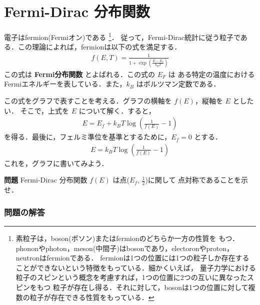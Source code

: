     \section{Fermi-Dirac 分布関数}
    電子はfermion(Fermiオン)である
        \footnote{
            素粒子は，boson(ボソン)またはfermionのどちらか一方の性質を
            もつ．phononやphoton，meson(中間子)はbosonであり，electoronやproton，neutronはfermionである．
            fermionは1つの位置には1つの粒子しか存在することができないという特徴をもっている．細かくいえば，
            量子力学における粒子のスピンという概念を考慮すれば，1つの位置に2つの互いに異なったスピンをもつ
            粒子が存在し得る．それに対して，bosonは1つの位置に対して複数の粒子が存在できる性質をもっている．
        }．
    従って，Fermi-Dirac統計に従う粒子である．この理論によれば，fermionは以下の式を満足する．
        \begin{align}
        f(E,T)=\frac{1}{1+\exp\left(\frac{E-E_{f}}{k_{B}T}\right)}
        \end{align}
    この式は {\bf Fermi分布関数} とよばれる．この式の $E_{F}$ は
    ある特定の温度におけるFermiエネルギーを表している．また，$k_{B}$ はボルツマン定数である．

    この式をグラフで表すことを考える．グラフの横軸を $f(E)$，縦軸を $E$ としたい．
    そこで，上式を $E$ について解く．すると，
        \begin{align*}
        E=E_{f}+k_{B}T\log\left(\frac{1}{f(E)}-1\right)
        \end{align*}
    を得る．最後に，フェルミ準位を基準とするために，$E_{f}=0$ とする．
        \begin{align*}
        E=k_{B}T\log\left(\frac{1}{f(E)}-1\right)
        \end{align*}
    これを，グラフに書いてみよう．


    \begin{itembox}[l]{{\bf 問題}}
        Fermi-Dirac 分布関数
        $f(E)$ は点($E_{f}$, $\displaystyle\frac{1}{2}$)に関して
        点対称であることを示せ．
    \end{itembox}
            \subsubsection*{問題の解答}
